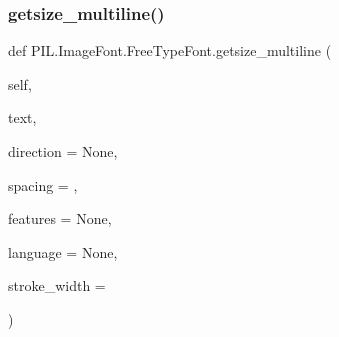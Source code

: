 \subsubsection{\texorpdfstring{getsize\+\_\+multiline()}{getsize\_multiline()}}
{\footnotesize\ttfamily def P\+I\+L.\+Image\+Font.\+Free\+Type\+Font.\+getsize\+\_\+multiline (\begin{DoxyParamCaption}\item[{}]{self,  }\item[{}]{text,  }\item[{}]{direction = {\ttfamily None},  }\item[{}]{spacing = {},  }\item[{}]{features = {\ttfamily None},  }\item[{}]{language = {\ttfamily None},  }\item[{}]{stroke\+\_\+width = {} }\end{DoxyParamCaption})}

